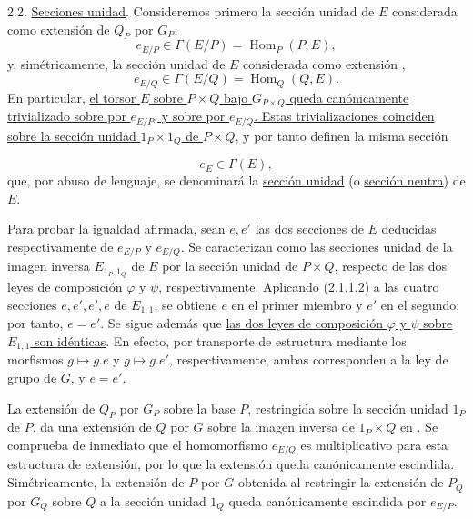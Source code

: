 2.2. \underline{Secciones unidad}. Consideremos primero la sección
unidad de $E$ considerada como extensión de $Q_P$ por $G_P$,
\begin{equation}\tag{2.2.1}
 e_{E/P}\in\Gamma(E/P)=\operatorname{Hom}_P(P,E),
\end{equation}
y, simétricamente, la sección unidad de $E$ considerada como extensión
,
\begin{equation}\tag{2.2.2}
 e_{E/Q}\in\Gamma(E/Q)=\operatorname{Hom}_Q(Q,E).
\end{equation}
En particular, \underline{el torsor $E$ sobre $P\times Q$ bajo
$G_{P\times Q}$ queda canónicamente trivializado sobre
 por $e_{E/P}$, y sobre
 por $e_{E/Q}$. Estas
trivializaciones coinciden sobre la sección unidad
$1_P\times1_Q$ de $P\times Q$}, y por tanto definen la misma sección


\begin{equation}\tag{2.2.3}
 e_E\in\Gamma(E),
\end{equation}
que, por abuso de lenguaje, se denominará la \underline{sección unidad}
(o \underline{sección neutra}) de $E$.

Para probar la igualdad afirmada, sean $e,e'$ las dos secciones de $E$
deducidas respectivamente de $e_{E/P}$ y $e_{E/Q}$. Se caracterizan
como las secciones unidad de la imagen inversa $E_{1_P,1_Q}$ de $E$ por
la sección unidad de $P\times Q$, respecto de las dos leyes de
composición $\varphi$ y $\psi$, respectivamente. Aplicando (2.1.1.2) a
las cuatro secciones $e,e',e',e$ de $E_{1,1}$, se obtiene $e$ en el
primer miembro y $e'$ en el segundo; por tanto, $e=e'$. Se sigue además
que \underline{las dos leyes de composición $\varphi$ y $\psi$ sobre
$E_{1,1}$ son idénticas}. En efecto, por transporte de estructura
mediante los morfismos $g\mapsto g.e$ y $g\mapsto g.e'$,
respectivamente, ambas corresponden a la ley de grupo de $G$, y
$e=e'$.

La extensión de $Q_P$ por $G_P$ sobre la base $P$, restringida sobre
la sección unidad $1_P$ de $P$, da una extensión de $Q$ por $G$ sobre
la imagen inversa de $1_P\times Q$ en . Se comprueba de
inmediato que el homomorfismo $e_{E/Q}$ es multiplicativo para esta
estructura de extensión, por lo que la extensión queda canónicamente
escindida. Simétricamente, la extensión de $P$ por $G$ obtenida al
restringir la extensión de $P_Q$ por $G_Q$ sobre $Q$ a la sección
unidad $1_Q$ queda canónicamente escindida por $e_{E/P}$.

